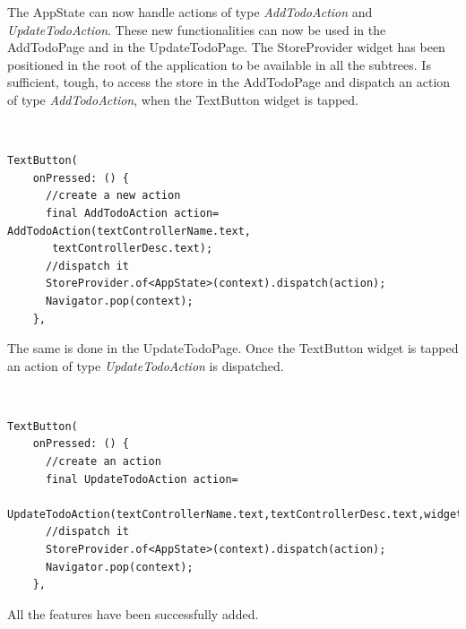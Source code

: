 The AppState can now handle actions of type \textit{AddTodoAction} and \textit{UpdateTodoAction}. These new functionalities can now be used in the AddTodoPage and in the UpdateTodoPage. The StoreProvider widget has been positioned in the root of the application to be available in all the subtrees. Is sufficient, tough, to access the store in the AddTodoPage and dispatch an action of type \textit{AddTodoAction}, when the TextButton widget is tapped.
\begin{code}
\mbox{}\\
 \mbox{}
		\label{code:2.14}
\begin{verbatim}
TextButton(
    onPressed: () {
      //create a new action
      final AddTodoAction action= AddTodoAction(textControllerName.text,
       textControllerDesc.text);
	  //dispatch it      
      StoreProvider.of<AppState>(context).dispatch(action);
      Navigator.pop(context);
    },
\end{verbatim}
\mbox{}
\end{code}

The same is done in the UpdateTodoPage. Once the TextButton widget is tapped an action of type \textit{UpdateTodoAction} is dispatched.
\begin{code}
\mbox{}\\
 \mbox{}
		\label{code:2.14}
\begin{verbatim}
TextButton(
    onPressed: () {
      //create an action
      final UpdateTodoAction action=
       UpdateTodoAction(textControllerName.text,textControllerDesc.text,widget.todo.id);
	  //dispatch it      
      StoreProvider.of<AppState>(context).dispatch(action);
      Navigator.pop(context);
    },
\end{verbatim}
\mbox{}
\end{code}

All the features have been successfully added.

